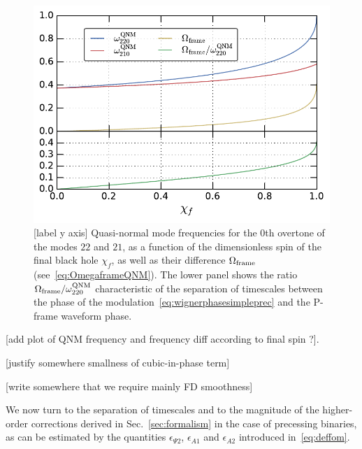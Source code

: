 \documentclass[aps,showpacs,twocolumn,
prd,superscriptaddress,nofootinbib]{revtex4-1}
\newcommand{\SM}[1]{{\color{Red} #1}}
\begin{document}
\begin{figure}
  \centering
  \includegraphics[width=.98\linewidth]{plots/postmergeromega_py.pdf}
  \caption{\SM{[label y axis]} Quasi-normal mode frequencies for the 0th overtone of the modes $22$ and $21$, as a function of the dimensionless spin of the final black hole $\chi_{f}$, as well as their difference $\Omega_{\rm frame}$ (see~\eqref{eq:OmegaframeQNM}). The lower panel shows the  ratio $\Omega_{\rm frame} / \omega^{\rm QNM}_{220}$ characteristic of the separation of timescales between the phase of the modulation~\eqref{eq:wignerphasesimpleprec} and the P-frame waveform phase.}
  \label{fig:QNM}
\end{figure}


\SM{[add plot of QNM frequency and frequency diff according to final spin ?]}.

\SM{[justify somewhere smallness of cubic-in-phase term]}

\SM{[write somewhere that we require mainly FD smoothness]}

We now turn to the separation of timescales and to the magnitude of the higher-order corrections derived in Sec.~\ref{sec:formalism} in the case of precessing binaries, as can be estimated by the quantities $\epsilon_{\Psi 2}$, $\epsilon_{A1}$ and $\epsilon_{A 2}$ introduced in~\eqref{eq:deffom}.
\end{document}
